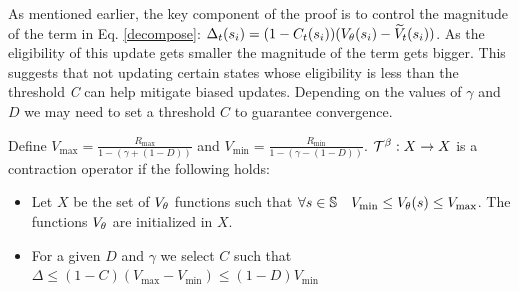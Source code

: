 As mentioned earlier, the key component of the proof is to control the magnitude of the term in Eq. \ref{decompose}: 
$\Delta_t(s_i) = (1-C_t(s_i))(V_{\theta}(s_i) - \widetilde{V}_t(s_i))$. As the eligibility of this update gets smaller the magnitude of the term gets bigger. This suggests that not updating certain states whose eligibility is less than the threshold \emph{C} can help mitigate biased updates.
Depending on the values of $\gamma$ and $D$ we may need to set a threshold $C$ to guarantee convergence.
\begin{theorem}
\label{contraction_theorem}
Define $V_{\max} = \frac{R_{\max}}{1-(\gamma+(1-D))}$ and $V_{\min} = \frac{R_{\min}}{1-(\gamma-(1-D))}$. $\mathcal{T}^{\beta}: X \rightarrow X$ is a contraction operator if the following holds:
\begin{itemize}
    \item Let $X$ be the set of $V_{\theta}$ functions such that $\forall s \in \mathbb{S} \quad  V_{\min} \leq V_{\theta}(s) \leq V_{\max}$.  The functions $V_{\theta}$ are initialized in $X$.
    \item For a given $D$ and $\gamma$ we select $C$ such that $\Delta \leq (1-C)(V_{\max}-V_{\min}) \leq (1-D)V_{\min}$
\end{itemize}
\end{theorem}
